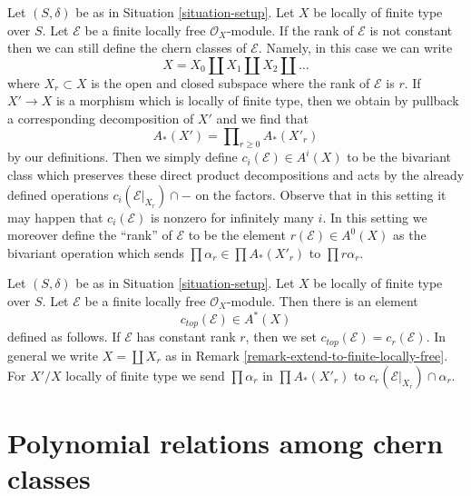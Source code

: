 \begin{remark}
\label{remark-extend-to-finite-locally-free}
Let $(S, \delta)$ be as in Situation \ref{situation-setup}.
Let $X$ be locally of finite type over $S$.
Let $\mathcal{E}$ be a finite locally free $\mathcal{O}_X$-module.
If the rank of $\mathcal{E}$ is not constant then we can
still define the chern classes of $\mathcal{E}$. Namely, in this
case we can write
$$
X = X_0 \amalg X_1 \amalg X_2 \amalg \ldots
$$
where $X_r \subset X$ is the open and closed subspace where
the rank of $\mathcal{E}$ is $r$. If $X' \to X$ is a morphism
which is locally of finite type, then we obtain by
pullback a corresponding decomposition of $X'$ and we find that
$$
A_*(X') = \prod\nolimits_{r \geq 0} A_*(X'_r)
$$
by our definitions. Then we simply define $c_i(\mathcal{E}) \in A^i(X)$
to be the bivariant class which preserves these direct
product decompositions and acts by the already defined
operations $c_i(\mathcal{E}|_{X_r}) \cap -$
on the factors. Observe that in this setting it may happen
that $c_i(\mathcal{E})$ is nonzero for infinitely many $i$.
In this setting we moreover define the ``rank'' of $\mathcal{E}$
to be the element $r(\mathcal{E}) \in A^0(X)$
as the bivariant operation which sends $\prod \alpha_r \in \prod A_*(X'_r)$
to $\prod r\alpha_r$.
\end{remark}

\begin{remark}
\label{remark-top-chern-class}
Let $(S, \delta)$ be as in Situation \ref{situation-setup}. Let $X$
be locally of finite type over $S$. Let $\mathcal{E}$ be a
finite locally free $\mathcal{O}_X$-module. Then there is an element
$$
c_{top}(\mathcal{E}) \in A^*(X)
$$
defined as follows. If $\mathcal{E}$ has constant rank $r$, then
we set $c_{top}(\mathcal{E}) = c_r(\mathcal{E})$. In general
we write $X = \coprod X_r$ as in
Remark \ref{remark-extend-to-finite-locally-free}.
For $X'/X$ locally of finite type we send $\prod \alpha_r$
in $\prod A_*(X'_r)$ to $c_r(\mathcal{E}|_{X_r}) \cap \alpha_r$.
\end{remark}











\section{Polynomial relations among chern classes}
\label{section-relations-chern-classes}


